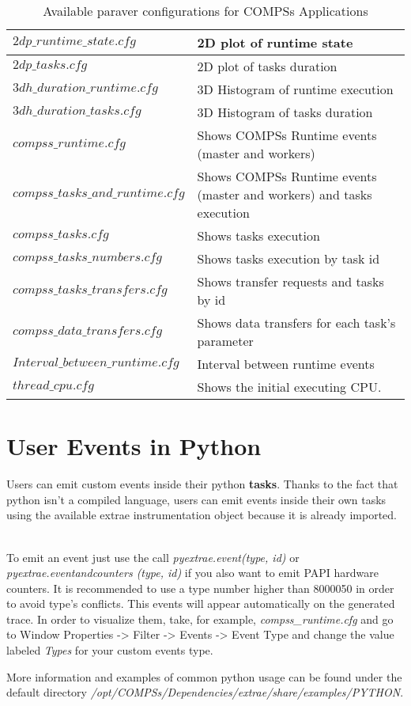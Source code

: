 \bgroup
  \def\arraystretch{1.5}
  \begin{table}[h]
    \begin{center}
      \begin{tabular}{| p{} | p{} |}
	\hline
	$2dp\_runtime\_state.cfg$		& 2D plot of runtime state \\ \hline
	$2dp\_tasks.cfg$			& 2D plot of tasks duration \\ \hline
	$3dh\_duration\_runtime.cfg$		& 3D Histogram of runtime execution \\ \hline
	$3dh\_duration\_tasks.cfg$		& 3D Histogram of tasks duration \\ \hline
	$compss\_runtime.cfg$ 			& Shows COMPSs Runtime events (master and workers) \\ \hline
	$compss\_tasks\_and\_runtime.cfg$ 	& Shows COMPSs Runtime events (master and workers) and tasks execution \\ \hline
	$compss\_tasks.cfg$ 			& Shows tasks execution \\ \hline
	$compss\_tasks\_numbers.cfg$ 		& Shows tasks execution by task id \\ \hline
	$compss\_tasks\_transfers.cfg$ 		& Shows transfer requests and tasks by id \\ \hline
	$compss\_data\_transfers.cfg$ 		& Shows data transfers for each task's parameter \\ \hline
	$Interval\_between\_runtime.cfg$ 	& Interval between runtime events \\ \hline
	$thread\_cpu.cfg$			& Shows the initial executing CPU. \\ \hline
      \end{tabular}
      \caption{Available paraver configurations for COMPSs Applications}
      \label{tab:paraver_configs}
    \end{center}
  \end{table}
\egroup

\section{User Events in Python}

Users can emit custom events inside their python \textbf{tasks}. Thanks to the fact that python isn't a compiled language, 
users can emit events inside their own tasks using the available extrae instrumentation object because it is already imported.
~ \newline

To emit an event just use the call \textit{pyextrae.event(type, id)} or \textit{pyextrae.eventandcounters
(type, id)} if you also want to emit PAPI hardware counters. It is recommended to use a type number higher than 8000050 in order 
to avoid type's conflicts. This events will appear automatically on the generated trace. In order to visualize them, take, 
for example, \textit{compss\_runtime.cfg} and go to Window Properties -> Filter -> Events -> Event Type and change the 
value labeled \textit{Types} for your custom events type.
~ \newline

More information and examples of common python usage can be found under the default directory 
\textit{/opt/COMPSs/Dependencies/extrae/share/examples/PYTHON}.

